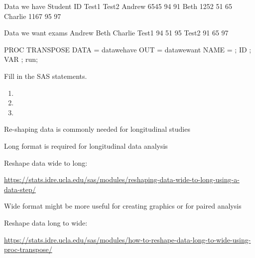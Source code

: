 \begin{frame}[fragile]
\begin{craw}{.0}{Data we have}
Student  ID   Test1  Test2
Andrew  6545   94     91
Beth    1252   51     65
Charlie 1167   95     97
\end{craw}
\emp
{} \hspace{0.05in} \emp
{}
\begin{craw}{.0}{Data we want}
exams  Andrew  Beth  Charlie
Test1    94     51      95
Test2    91     65      97
\end{craw}
\emp
\vskip10pt
\begin{code}{.0}
PROC TRANSPOSE
   DATA = datawehave
   OUT = datawewant
   NAME = \textcolor{OrangeRed}{};
   ID     \textcolor{OrangeRed}{};
   VAR    \textcolor{OrangeRed}{};
run;
\end{code}
\emp
{} \hspace{0.05in} \emp
{}
\begin{clicker}{Fill in the SAS statements.}
\begin{enumerate}
\item %
\item %
\item %
\end{enumerate}
\end{clicker}
\emp
\end{frame}

\begin{frame}
\bi
\item Re-shaping data is commonly needed for longitudinal studies
\item Long format is required for longitudinal data analysis
\bi
\item[] Reshape data wide to long:
\item[] \url{https://stats.idre.ucla.edu/sas/modules/reshaping-data-wide-to-long-using-a-data-step/}
\ei
\item Wide format might be more useful for creating graphics or for paired analysis
\bi
\item[] Reshape data long to wide:
\item[] \url{https://stats.idre.ucla.edu/sas/modules/how-to-reshape-data-long-to-wide-using-proc-transpose/}
\ei
\ei
\end{frame}



